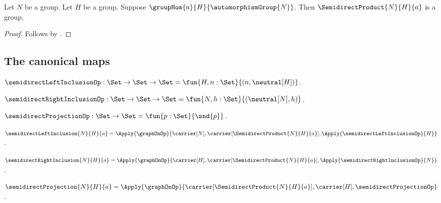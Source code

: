 \begin{corollary}\label{semidirect_product_is_group}
    Let $N$ be a group.
    Let $H$ be a group.
    Suppose $\groupHom{a}{H}{\automorphismGroup{N}}$.
    Then $\SemidirectProduct{N}{H}{a}$ is a group.
\end{corollary}
\begin{proof}
    Follows by .
\end{proof}

\subsection{The canonical maps}

\begin{definition}\label{semidirect_left_inclusion_op}
    $\semidirectLeftInclusionOp:\Set\to\Set\to\Set
        =\fun{H,n:\Set}{(n,\neutral[H])}$.
\end{definition}

\begin{definition}\label{semidirect_right_inclusion_op}
    $\semidirectRightInclusionOp:\Set\to\Set\to\Set
        =\fun{N,h:\Set}{(\neutral[N],h)}$.
\end{definition}

\begin{definition}\label{semidirect_projection_op}
    $\semidirectProjectionOp:\Set\to\Set
        =\fun{p:\Set}{\snd{p}}$.
\end{definition}

\begin{definition}\label{semidirect_left_inclusion}
    $\semidirectLeftInclusion{N}{H}{a}=
        \Apply{\graphOnOp}
            {\carrier[N],\carrier[\SemidirectProduct{N}{H}{a}],
             \Apply{\semidirectLeftInclusionOp}{H}}$.
\end{definition}

\begin{definition}\label{semidirect_right_inclusion}
    $\semidirectRightInclusion{N}{H}{a}=
        \Apply{\graphOnOp}
            {\carrier[H],\carrier[\SemidirectProduct{N}{H}{a}],
             \Apply{\semidirectRightInclusionOp}{N}}$.
\end{definition}

\begin{definition}\label{semidirect_projection}
    $\semidirectProjection{N}{H}{a}=
        \Apply{\graphOnOp}
            {\carrier[\SemidirectProduct{N}{H}{a}],\carrier[H],
             \semidirectProjectionOp}$.
\end{definition}

